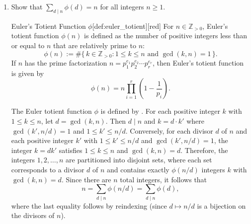 \begin{enumerate}
\begin{define}{Möbius Inversion Formula*}[thm:mobiusinv][red]
\begin{subprove}
      ($\Leftarrow$) Assume $g(n)=\sum_{d\mid n, d>0}\mu(d)f(n/d)$ for all $n\ge 1$. Define $F(n) = \sum_{d\mid n, d>0}f(d)$ for all $n\ge 1$.
      
      Then
      \begin{align*}
        \sum_{d\mid n, d>0}g(d) &= \sum_{d\mid n, d>0}\sum_{e\mid d, e>0}\mu(e)f(d/e)\\
        &= \sum_{e\mid n, e>0}\mu(e)\sum_{d\mid n, e\mid d, d>0}f(d/e).
      \end{align*}
      Let $k = d/e$, so $k\mid (n/e)$ and $ke = d\mid n$. Then this becomes
      \[
      \sum_{e\mid n, e>0}\mu(e)\sum_{k\mid (n/e), k>0}f(k) = \sum_{e\mid n, e>0}\mu(e)F(n/e),
      \]
      where $F(n/e) = \sum_{k\mid (n/e), k>0}f(k)$.
      
      By the forward direction we already proved, since $F(n) = \sum_{d\mid n, d>0}f(d)$ for all $n\ge 1$, we have $f(n) = \sum_{d\mid n, d>0}\mu(d)F(n/d)$ for all $n\ge 1$. Therefore:
      \[
      \sum_{e\mid n, e>0}\mu(e)F(n/e) = f(n).
      \]
      Therefore, $\sum_{d\mid n, d>0}g(d) = f(n)$.
    \end{subprove}
  \end{define}

  \newpage





  \item Show that $\sum_{d \mid n} \phi(d)=n$ for all integers $n \geq 1$.
  \begin{define}{Euler's Totient Function $\phi$}[def:euler_totient][red]
    For $n \in \mathbb{Z}_{>0}$, Euler's totient function $\phi(n)$ is defined as the number of positive integers less than or equal to $n$ that are relatively prime to $n$:
    \[
    \phi(n) := \#\{\,k \in \mathbb{Z}_{>0} : 1 \le k \le n \text{ and } \gcd(k, n) = 1\,\}.
    \]
    If $n$ has the prime factorization $n = p_1^{e_1} p_2^{e_2} \cdots p_r^{e_r}$, then Euler's totient function is given by
    \[
    \phi(n) = n \prod_{i=1}^{r} \left(1 - \frac{1}{p_i}\right).
    \]
  \end{define}  
  \begin{subprove}
    The Euler totient function $\phi$ is defined by . 
    For each positive integer $k$ with $1 \leq k \leq n$, let $d = \gcd(k, n)$. Then $d \mid n$ and $k = d \cdot k'$ where $\gcd(k', n/d) = 1$ and $1 \leq k' \leq n/d$.
    Conversely, for each divisor $d$ of $n$ and each positive integer $k'$ with $1 \leq k' \leq n/d$ and $\gcd(k', n/d) = 1$, the integer $k = dk'$ satisfies $1 \leq k \leq n$ and $\gcd(k, n) = d$.
    Therefore, the integers $1, 2, \ldots, n$ are partitioned into disjoint sets, where each set corresponds to a divisor $d$ of $n$ and contains exactly $\phi(n/d)$ integers $k$ with $\gcd(k, n) = d$.
    Since there are $n$ total integers, it follows that
    \[
    n = \sum_{d \mid n} \phi(n/d) = \sum_{d \mid n} \phi(d),
    \]
    where the last equality follows by reindexing (since $d \mapsto n/d$ is a bijection on the divisors of $n$).
    

\end{subprove}
\end{enumerate}
